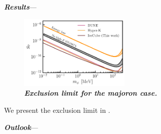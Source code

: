 \textbf{\textit{Results}}---
\begin{figure}[t!]
    \centering
    \includegraphics[width=0.47\textwidth]{figures/majoran_sensitivity}
    \caption{\textbf{\textit{Exclusion limit for the majoron case.}}
    }
    \label{fig:sensitivity}
\end{figure}
We present the exclusion limit in .

\textbf{\textit{Outlook}}---
